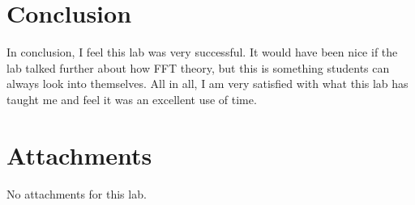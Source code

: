 \documentclass[12pt]{report}
\begin{document}
\section{Conclusion}
In conclusion, I feel this lab was very successful. It would have been nice if the lab talked further about how FFT theory, but this is something students can always look into
themselves. All in all, I am very satisfied with what this lab has taught me and feel it was an 
excellent use of time.
\newpage
\thispagestyle{customblank}
\section{Attachments}\label{section: Attachments}
No attachments for this lab.
\vspace*{\fill}

% 
% 


\end{document}
